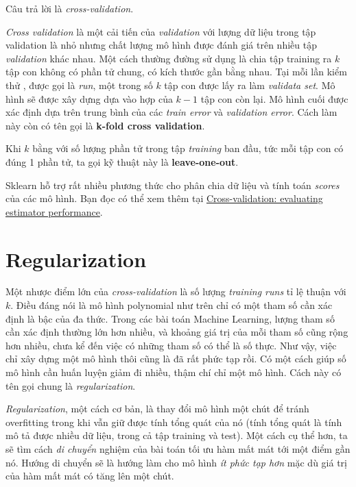 Câu trả lời là \textit{cross-validation}. 
 
\textit{Cross validation} là một cải tiến của \textit{validation} với lượng dữ liệu trong tập validation là nhỏ nhưng chất lượng mô hình được đánh giá trên nhiều tập \textit{validation} khác nhau. Một cách thường đường sử dụng là chia tập training ra $k$ tập con không có phần tử chung, có kích thước gần bằng nhau. Tại mỗi lần kiểm thử , được gọi là \textit{run}, một trong số $k$ tập con được lấy ra làm \textit{validata set}. Mô hình sẽ được xây dựng dựa vào hợp của $k-1$ tập con còn lại. Mô hình cuối được xác định dựa trên trung bình của các \textit{train error} và \textit{validation error}. Cách làm này còn có tên gọi là \textbf{k-fold cross validation}. 
 
Khi $k$ bằng với số lượng phần tử trong tập \textit{training} ban đầu, tức mỗi tập con có đúng 1 phần tử, ta gọi kỹ thuật này là \textbf{leave-one-out}. 
 
Sklearn hỗ trợ rất nhiều phương thức cho phân chia dữ liệu và tính toán \textit{scores} của các mô hình. Bạn đọc có thể xem thêm tại \href{http://scikit-learn.org/stable/modules/cross_validation.html}{Cross-validation: evaluating estimator performance}. 
 
 
 
 
 
\section{Regularization}
 
 
Một nhược điểm lớn của \textit{cross-validation} là số lượng \textit{training runs} tỉ lệ thuận với $k$. Điều đáng nói là mô hình polynomial như trên chỉ có một tham số cần xác định là bậc của đa thức. Trong các bài toán Machine Learning, lượng tham số cần xác định thường lớn hơn nhiều, và khoảng giá trị của mỗi tham số cũng rộng hơn nhiều, chưa kể đến việc có những tham số có thể là số thực. Như vậy, việc chỉ xây dựng một mô hình thôi cũng là đã rất phức tạp rồi. Có một cách giúp số mô hình cần huấn luyện giảm đi nhiều, thậm chí chỉ một mô hình. Cách này có tên gọi chung là \textit{regularization}. 
 
\textit{Regularization}, một cách cơ bản, là thay đổi mô hình một chút để tránh overfitting trong khi vẫn giữ được tính tổng quát của nó (tính tổng quát là tính mô tả được nhiều dữ liệu, trong cả tập training và test). Một cách cụ thể hơn, ta sẽ tìm cách \textit{di chuyển} nghiệm của bài toán tối ưu hàm mất mát tới một điểm gần nó. Hướng di chuyển sẽ là hướng làm cho mô hình \textit{ít phức tạp hơn} mặc dù giá trị của hàm mất mát có tăng lên một chút. 
 
